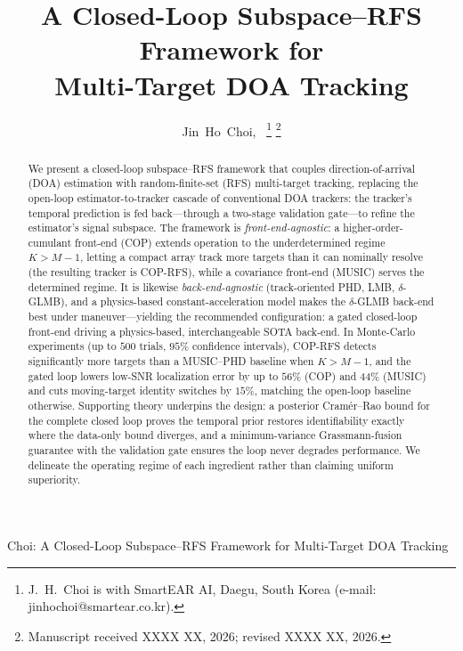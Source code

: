 \documentclass[journal]{IEEEtran}
\begin{document}
\title{A Closed-Loop Subspace--RFS Framework for\\Multi-Target DOA Tracking}

\author{Jin~Ho~Choi,~
\thanks{J.~H.~Choi is with SmartEAR AI, Daegu, South Korea (e-mail: jinhochoi@smartear.co.kr).}
\thanks{Manuscript received XXXX XX, 2026; revised XXXX XX, 2026.}}

{Choi: A Closed-Loop Subspace--RFS Framework for Multi-Target DOA Tracking}

\maketitle

\begin{abstract}
We present a closed-loop subspace--RFS framework that couples direction-of-arrival (DOA) estimation with random-finite-set (RFS) multi-target tracking, replacing the open-loop estimator-to-tracker cascade of conventional DOA trackers: the tracker's temporal prediction is fed back---through a two-stage validation gate---to refine the estimator's signal subspace. The framework is \emph{front-end-agnostic}: a higher-order-cumulant front-end (COP) extends operation to the underdetermined regime $K>M{-}1$, letting a compact array track more targets than it can nominally resolve (the resulting tracker is COP-RFS), while a covariance front-end (MUSIC) serves the determined regime. It is likewise \emph{back-end-agnostic} (track-oriented PHD, LMB, $\delta$-GLMB), and a physics-based constant-acceleration model makes the $\delta$-GLMB back-end best under maneuver---yielding the recommended configuration: a gated closed-loop front-end driving a physics-based, interchangeable SOTA back-end. In Monte-Carlo experiments (up to $500$ trials, $95\%$ confidence intervals), COP-RFS detects significantly more targets than a MUSIC--PHD baseline when $K>M{-}1$, and the gated loop lowers low-SNR localization error by up to $56\%$ (COP) and $44\%$ (MUSIC) and cuts moving-target identity switches by $15\%$, matching the open-loop baseline otherwise. Supporting theory underpins the design: a posterior Cram\'{e}r--Rao bound for the complete closed loop proves the temporal prior restores identifiability exactly where the data-only bound diverges, and a minimum-variance Grassmann-fusion guarantee with the validation gate ensures the loop never degrades performance. We delineate the operating regime of each ingredient rather than claiming uniform superiority.
\end{abstract}
\end{document}
